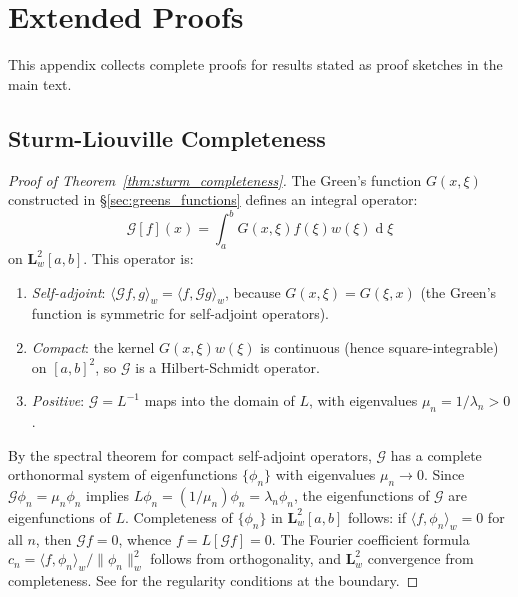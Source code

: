 \documentclass[12pt,a4paper]{report}
\DeclareMathOperator{\deriv}{d}
\theoremstyle{thms}
\theoremstyle{defns}
\begin{document}



\appendix

\chapter{Extended Proofs}
\label{app:proofs}

This appendix collects complete proofs for results stated as proof sketches in the main text.

\section{Sturm-Liouville Completeness}
\label{app:proof_sl_completeness}

\begin{proof}[Proof of Theorem~\ref{thm:sturm_completeness}]
    The Green's function $G(x, \xi)$ constructed in \S\ref{sec:greens_functions} defines an integral operator:
    \begin{equation}
        \mathcal{G}[f](x) = \int_a^b G(x, \xi)f(\xi)w(\xi)\deriv{\xi}
    \end{equation}
    on $\mathbf{L}^2_w[a, b]$. This operator is:
    \begin{enumerate}
        \item \textit{Self-adjoint}: $\langle \mathcal{G}f, g \rangle_w = \langle f, \mathcal{G}g \rangle_w$, because $G(x, \xi) = G(\xi, x)$ (the Green's function is symmetric for self-adjoint operators).
        \item \textit{Compact}: the kernel $G(x, \xi)w(\xi)$ is continuous (hence square-integrable) on $[a,b]^2$, so $\mathcal{G}$ is a Hilbert-Schmidt operator.
        \item \textit{Positive}: $\mathcal{G} = L^{-1}$ maps into the domain of $L$, with eigenvalues $\mu_n = 1/\lambda_n > 0$.
    \end{enumerate}

    By the spectral theorem for compact self-adjoint operators, $\mathcal{G}$ has a complete orthonormal system of eigenfunctions $\{\phi_n\}$ with eigenvalues $\mu_n \to 0$. Since $\mathcal{G}\phi_n = \mu_n\phi_n$ implies $L\phi_n = (1/\mu_n)\phi_n = \lambda_n\phi_n$, the eigenfunctions of $\mathcal{G}$ are eigenfunctions of $L$. Completeness of $\{\phi_n\}$ in $\mathbf{L}^2_w[a,b]$ follows: if $\langle f, \phi_n \rangle_w = 0$ for all $n$, then $\mathcal{G}f = 0$, whence $f = L[\mathcal{G}f] = 0$. The Fourier coefficient formula $c_n = \langle f, \phi_n \rangle_w / \|\phi_n\|^2_w$ follows from orthogonality, and $\mathbf{L}^2_w$ convergence from completeness. See \cite{courant_hilbert} for the regularity conditions at the boundary.
\end{proof}
\end{document}
